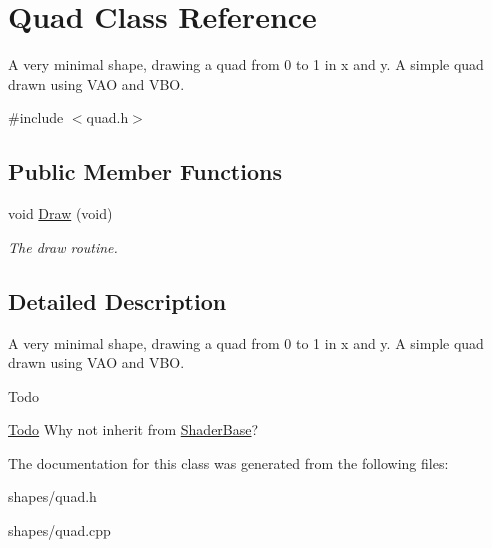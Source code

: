 \hypertarget{classQuad}{\section{\-Quad \-Class \-Reference}
\label{classQuad}
}


\-A very minimal shape, drawing a quad from 0 to 1 in x and y. \-A simple quad drawn using \-V\-A\-O and \-V\-B\-O.  




{\ttfamily \#include $<$quad.\-h$>$}

\subsection*{\-Public \-Member \-Functions}
\begin{DoxyCompactItemize}
\item 
\hypertarget{classQuad_ac9fd55b0f273d9829f7991c3fdfc80ee}{void \hyperlink{classQuad_ac9fd55b0f273d9829f7991c3fdfc80ee}{\-Draw} (void)}\label{classQuad_ac9fd55b0f273d9829f7991c3fdfc80ee}

\begin{DoxyCompactList}\small\item\em \-The draw routine. \end{DoxyCompactList}\end{DoxyCompactItemize}


\subsection{\-Detailed \-Description}
\-A very minimal shape, drawing a quad from 0 to 1 in x and y. \-A simple quad drawn using \-V\-A\-O and \-V\-B\-O. 

\begin{DoxyRefDesc}{\-Todo}
\item[\hyperlink{todo__todo000005}{\-Todo}]\-Why not inherit from \hyperlink{classShaderBase}{\-Shader\-Base}? \end{DoxyRefDesc}


\-The documentation for this class was generated from the following files\-:\begin{DoxyCompactItemize}
\item 
shapes/quad.\-h\item 
shapes/quad.\-cpp\end{DoxyCompactItemize}
